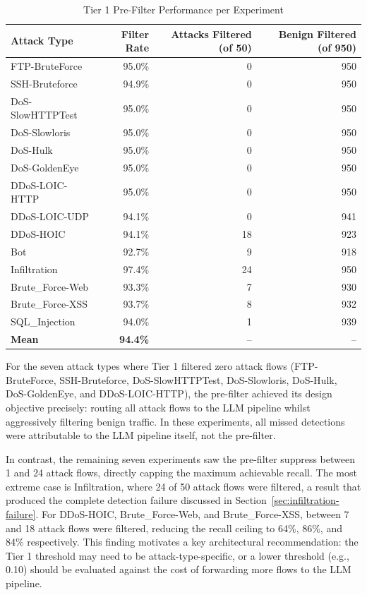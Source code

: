 \documentclass[../main.tex]{subfiles}
\begin{document}
\begin{table}[H]
\centering
\caption{Tier 1 Pre-Filter Performance per Experiment}
\label{tab:tier1-performance}
\small
\begin{tabular}{l r r r}
\toprule
Attack Type & Filter Rate & Attacks Filtered (of 50) & Benign Filtered (of 950) \\
\midrule
FTP-BruteForce & 95.0\% & 0 & 950 \\
SSH-Bruteforce & 94.9\% & 0 & 950 \\
DoS-SlowHTTPTest & 95.0\% & 0 & 950 \\
DoS-Slowloris & 95.0\% & 0 & 950 \\
DoS-Hulk & 95.0\% & 0 & 950 \\
DoS-GoldenEye & 95.0\% & 0 & 950 \\
DDoS-LOIC-HTTP & 95.0\% & 0 & 950 \\
DDoS-LOIC-UDP & 94.1\% & 0 & 941 \\
DDoS-HOIC & 94.1\% & 18 & 923 \\
Bot & 92.7\% & 9 & 918 \\
Infiltration & 97.4\% & 24 & 950 \\
Brute\_Force-Web & 93.3\% & 7 & 930 \\
Brute\_Force-XSS & 93.7\% & 8 & 932 \\
SQL\_Injection & 94.0\% & 1 & 939 \\
\midrule
\textbf{Mean} & \textbf{94.4\%} & -- & -- \\
\bottomrule
\end{tabular}
\end{table}

For the seven attack types where Tier 1 filtered zero attack flows (FTP-BruteForce, SSH-Bruteforce, DoS-SlowHTTPTest, DoS-Slowloris, DoS-Hulk, DoS-GoldenEye, and DDoS-LOIC-HTTP), the pre-filter achieved its design objective precisely: routing all attack flows to the LLM pipeline whilst aggressively filtering benign traffic. In these experiments, all missed detections were attributable to the LLM pipeline itself, not the pre-filter.

In contrast, the remaining seven experiments saw the pre-filter suppress between 1 and 24 attack flows, directly capping the maximum achievable recall. The most extreme case is Infiltration, where 24 of 50 attack flows were filtered, a result that produced the complete detection failure discussed in Section~\ref{sec:infiltration-failure}. For DDoS-HOIC, Brute\_Force-Web, and Brute\_Force-XSS, between 7 and 18 attack flows were filtered, reducing the recall ceiling to 64\%, 86\%, and 84\% respectively. This finding motivates a key architectural recommendation: the Tier 1 threshold may need to be attack-type-specific, or a lower threshold (e.g., 0.10) should be evaluated against the cost of forwarding more flows to the LLM pipeline.
\end{document}
